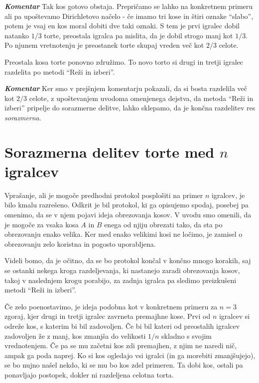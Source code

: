 \documentclass[a4paper,12pt]{article}
\begin{document}
\begin{protokol}
\item [\textbf{\em Komentar}]Tak kos gotovo obstaja. Prepričamo se lahko na konkretnem primeru ali pa upoštevamo Dirichletovo načelo - če imamo tri kose in štiri oznake ``slabo'', potem je vsaj en kos moral dobiti dve taki oznaki. S tem je prvi igralec dobil natanko $1/3$ torte, preostala igralca pa mislita, da je dobil strogo manj kot $1/3$. Po njunem vretnotenju je preostanek torte skupaj vreden več kot $2/3$ celote.

\item Preostala kosa torte ponovno združimo. To novo torto si drugi in tretji igralec razdelita po metodi ``Reži in izberi''.

\item [\textbf{\em Komentar}] Ker smo v prejšnjem komentarju pokazali, da si bosta razdelila več kot $2/3$ celote, z upoštevanjem uvodoma omenjenega dejstva, da metoda ``Reži in izberi'' pripelje do sorazmerne delitve, lahko sklepamo, da je končna razdelitev res  {\em sorazmerna}.

\end{protokol}

\section{Sorazmerna delitev torte med $n$ igralcev}

Vprašanje, ali je mogoče predhodni protokol posplošiti na primer $n$ igralcev, je bilo kmalu razrešeno. Odkrit je bil protokol, ki ga opisujemo spodaj, posebej pa omenimo, da se v njem pojavi ideja obrezovanja kosov. V uvodu smo omenili, da je mogoče za vsaka kosa $A$ in $B$ enega od njiju obrezati tako, da sta po obrezovanju enako velika. Ker med enako velikimi kosi ne ločimo, je zamisel o obrezovanju zelo koristna in pogosto uporabljena. 

Videli bomo, da je očitno, da se bo protokol končal v končno mnogo korakih, saj se ostanki nekega kroga razdeljevanja, ki nastanejo zaradi obrezovanja kosov, takoj v naslednjem krogu porabijo, za zadnja igralca pa sledimo preizkušeni metodi ``Reži in izberi''. 

Če zelo poenostavimo, je ideja podobna kot v konkretnem primeru za $n = 3$ zgoraj, kjer drugi in tretji igralec zavrneta premajhne kose. Prvi od $n$ igralcev si odreže kos, s katerim bi bil zadovoljen. Če bi bil kateri od preostalih igralcev zadovoljen že z manj, kos zmanjša do velikosti $1/n$ skladno s svojim vrednotenjem. Če pa se mu začetni kos zdi premajhen, z njim ne naredi nič, ampak ga poda naprej. Ko si kos ogledajo vsi igralci (in ga morebiti zmanjšujejo), se bo nujno našel nekdo, ki se mu bo kos zdel primeren. Ta dobi kos, ostali pa ponavljajo postopek, dokler ni razdeljena celotna torta.
\end{document}
